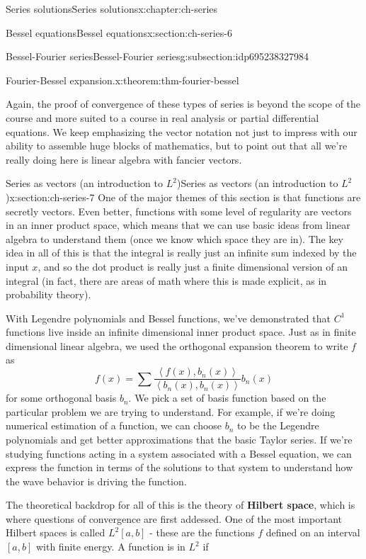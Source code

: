 \documentclass[oneside,10pt,]{book}
\newcommand{\terminology}[1]{\textbf{#1}}
\numberwithin{equation}{section}
\newcommand{\ip}[2]{\left\langle #1, #2 \right\rangle}
\numberwithin{equation}{section}
\begin{document}
\begin{chapterptx}{Series solutions}{}{Series solutions}{}{}{x:chapter:ch-series}
\begin{sectionptx}{Bessel equations}{}{Bessel equations}{}{}{x:section:ch-series-6}
\begin{subsectionptx}{Bessel-Fourier series}{}{Bessel-Fourier series}{}{}{g:subsection:idp695238327984}
\begin{theorem}{Fourier-Bessel expansion.}{}{x:theorem:thm-fourier-bessel}
\begin{equation*}
\end{equation*}
%
\end{theorem}
Again, the proof of convergence of these types of series is beyond the scope of the course and more suited to a course in real analysis or partial differential equations. We keep emphasizing the vector notation not just to impress with our ability to assemble huge blocks of mathematics, but to point out that all we're really doing here is linear algebra with fancier vectors.%
\end{subsectionptx}
\end{sectionptx}
%
%
\typeout{************************************************}
\typeout{************************************************}
%
\begin{sectionptx}{Series as vectors (an introduction to \(L^2\))}{}{Series as vectors (an introduction to \(L^2\))}{}{}{x:section:ch-series-7}
One of the major themes of this section is that functions are secretly vectors. Even better, functions with some level of regularity are vectors in an inner product space, which means that we can use basic ideas from linear algebra to understand them (once we know which space they are in). The key idea in all of this is that the integral is really just an infinite sum indexed by the input \(x\), and so the dot product is really just a finite dimensional version of an integral (in fact, there are areas of math where this is made explicit, as in probability theory).%
\par
With Legendre polynomials and Bessel functions, we've demonstrated that \(C^1\) functions live inside an infinite dimensional inner product space. Just as in finite dimensional linear algebra, we used the orthogonal expansion theorem to write \(f\) as%
\begin{equation*}
f(x) = \sum \frac{\ip{f(x)}{b_n(x)}}{\ip{b_n(x)}{b_n(x)}} b_n(x)
\end{equation*}
for some orthogonal basis \(b_n\). We pick a set of basis function based on the particular problem we are trying to understand. For example, if we're doing numerical estimation of a function, we can choose \(b_n\) to be the Legendre polynomials and get better approximations that the basic Taylor series. If we're studying functions acting in a system associated with a Bessel equation, we can express the function in terms of the solutions to that system to understand how the wave behavior is driving the function.%
\par
The theoretical backdrop for all of this is the theory of \terminology{Hilbert space}, which is where questions of convergence are first addessed. One of the most important Hilbert spaces is called \(L^2[a,b]\) - these are the functions \(f\) defined on an interval \([a,b]\) with finite energy. A function is in \(L^2\) if%

\end{sectionptx}
\end{chapterptx}
\end{document}

